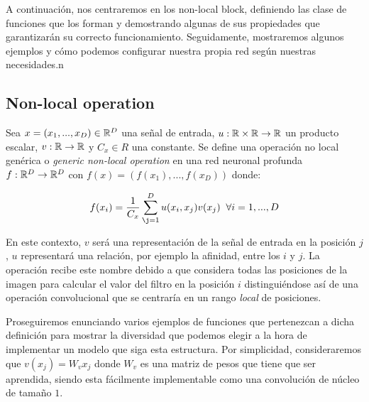 A continuación, nos centraremos en los non-local block, definiendo las clase de funciones que los forman y demostrando algunas de sus propiedades que garantizarán su correcto funcionamiento. Seguidamente, mostraremos algunos ejemplos y cómo podemos configurar nuestra propia red según nuestras necesidades.n\newline

\subsection{Non-local operation}

\begin{definicion}
 Sea $x=(x_1,...,x_D)\in \mathbb{R}^D$ una señal de entrada, $u:\mathbb{R} \times \mathbb{R} \to \mathbb{R}$ un producto escalar, $v:\mathbb{R} \to \mathbb{R}$ y $C_x\in R$ una constante.  Se define una operación no local genérica o \emph{generic non-local operation} en una red neuronal profunda $f:\mathbb{R}^D \to \mathbb{R}^D$ con $f(x)=(f(x_1),...,f(x_D))$ donde:

 $$f(x_i)=\frac{1}{C_x}\sum_{\j=1}^{D} u(x_i,x_j)v(x_j) \; \;  \forall i=1,...,D$$
\end{definicion}

 En este contexto, $v$ será una representación de la señal de entrada en la posición $j$, $u$ representará una relación, por ejemplo la afinidad, entre los $i$ y $j$. La operación recibe este nombre debido a que considera todas las posiciones de la imagen para calcular el valor del filtro en la posición $i$ distinguiéndose así de una operación convolucional que se centraría en un rango \emph{local} de posiciones.%

Proseguiremos enunciando varios ejemplos de funciones que pertenezcan a dicha definición para mostrar la diversidad que podemos elegir a la hora de implementar un modelo que siga esta estructura. Por simplicidad, consideraremos que $v(x_j)=W_v x_j$ donde $W_v$ es una matriz de pesos que tiene que ser aprendida, siendo esta fácilmente implementable como una convolución de núcleo de tamaño $1$.

